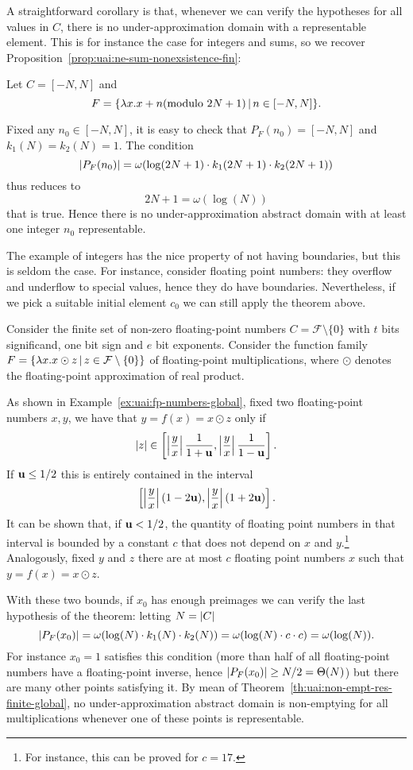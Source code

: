 A straightforward corollary is that, whenever we can verify the hypotheses for all values in $C$, there is no under-approximation domain with a representable element. This is for instance the case for integers and sums, so we recover Proposition~\ref{prop:uai:ne-sum-nonexsistence-fin}:
\begin{example}
	Let $C = [-N, N]$ and
	\[
	F = \{ \lambda x. x + n (\text{modulo } 2N+1) \,\vert\, n \in [-N, N] \} .
	\]

	Fixed any $n_0 \in [-N, N]$, it is easy to check that $P_F(n_0) = [-N, N]$ and $k_1(N) = k_2(N) = 1$. The condition
	\[
	\lvert P_F(n_0)\rvert = \omega(\log(2N + 1) \cdot k_1(2N + 1) \cdot k_2(2N + 1))
	\]
	thus reduces to
	\[
	2N + 1 = \omega(\log(N))
	\]
	that is true. Hence there is no under-approximation abstract domain with at least one integer $n_0$ representable.
\end{example}
The example of integers has the nice property of not having boundaries, but this is seldom the case. For instance, consider floating point numbers: they overflow and underflow to special values, hence they do have boundaries. Nevertheless, if we pick a suitable initial element $c_0$ we can still apply the theorem above.

\begin{example}
	Consider the finite set of non-zero floating-point numbers $C = \mathcal{F} \setminus \{ 0 \}$ with $t$ bits significand, one bit sign and $e$ bit exponents.
	Consider the function family $F = \{ \lambda x . x \odot z \,\vert\, z \in \mathcal{F} \setminus \{ 0 \} \}$ of floating-point multiplications, where $\odot$ denotes the floating-point approximation of real product.

	As shown in Example~\ref{ex:uai:fp-numbers-global}, fixed two floating-point numbers $x, y$, we have that $y = f(x) = x \odot z$ only if
	\[
	\lvert z\rvert \in \left[ \left\lvert\frac{y}{x}\right\rvert \frac{1}{1+\textbf{u}}, \left\lvert\frac{y}{x}\right\rvert \frac{1}{1-\textbf{u}} \right] .
	\]
	If $\textbf{u} \le 1 / 2$ this is entirely contained in the interval
	\[
	\left[ \left\lvert\frac{y}{x}\right\rvert (1 - 2 \textbf{u}), \left\lvert\frac{y}{x}\right\rvert (1 + 2 \textbf{u}) \right] \text{.}
	\]
	It can be shown that, if $\textbf{u} < 1 / 2$, the quantity of floating point numbers in that interval is bounded by a constant $c$ that does not depend on $x$ and $y$.\footnote{For instance, this can be proved for $c = 17$.}
	Analogously, fixed $y$ and $z$ there are at most $c$ floating point numbers $x$ such that $y = f(x) = x \odot z$.

	With these two bounds, if $x_0$ has enough preimages we can verify the last hypothesis of the theorem: letting $N = \lvert C\rvert$
	\[
	\lvert P_F(x_0)\rvert = \omega(\log(N) \cdot k_1(N) \cdot k_2(N)) = \omega(\log(N) \cdot c \cdot c) = \omega(\log(N)) .
	\]
	For instance $x_0 = 1$ satisfies this condition (more than half of all floating-point numbers have a floating-point inverse, hence $\lvert P_F(x_0)\rvert \ge N / 2 = \Theta(N)$) but there are many other points satisfying it.
	By mean of Theorem~\ref{th:uai:non-empt-res-finite-global}, no under-approximation abstract domain is non-emptying for all multiplications whenever one of these points is representable.
\end{example}

